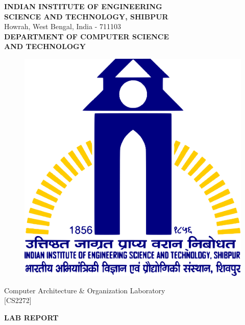 \documentclass[a4paper]{article}
\begin{document}
\begin{titlepage}
    
    \begin{center}

        \textup{\large  \textbf{INDIAN INSTITUTE OF ENGINEERING}\\\textbf{SCIENCE AND TECHNOLOGY, SHIBPUR}}\\ 
        Howrah, West Bengal, India - 711103\\[1cm]
        
        \textbf{\large DEPARTMENT OF COMPUTER SCIENCE}\\
        \textbf{\large AND TECHNOLOGY}\\[1cm]
        
        \begin{center}
            \begin{figure}[h]   %
                \centering
                \includegraphics[width=0.3\linewidth]{Pictures/IIESTS Logo.png}
            \end{figure}
        \end{center}
        
        
        \textup{\large Computer Architecture \& Organization Laboratory\\[0.4cm][CS2272]}\\[1cm]
        
        \begin{LARGE}
            {\textbf {LAB REPORT}}
        \end{LARGE}\\[1cm]
        

\end{center}
\end{titlepage}
\end{document}
